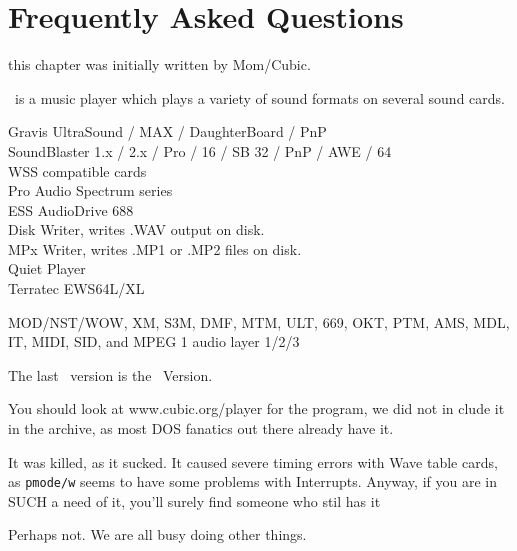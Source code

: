 %
%

\chapter{Frequently Asked Questions}
this chapter was initially written by Mom/Cubic.

{\cp\ is a music player which plays a variety of sound formats on several sound cards.}

{Gravis UltraSound / MAX / DaughterBoard / PnP\\
SoundBlaster 1.x / 2.x / Pro / 16 / SB 32 / PnP / AWE / 64\\
WSS compatible cards\\
Pro Audio Spectrum series\\
ESS AudioDrive 688\\
Disk Writer, writes .WAV output on disk.\\
MPx Writer, writes .MP1 or .MP2 files on disk.\\
Quiet Player\\
Terratec EWS64L/XL}

{MOD/NST/WOW, XM, S3M, DMF, MTM, ULT, 669, OKT, PTM, AMS, MDL, IT, MIDI, SID, and MPEG 1 audio layer 1/2/3}

{The last \cp\ version is the \cpversion\ Version.}

{You should look at www.cubic.org/player for the program, we did not in clude it in the archive, as most DOS fanatics out there already have it.}

{It was killed, as it sucked. It caused severe timing errors with Wave table
cards, as \texttt{pmode/w} seems to have some problems with Interrupts.
Anyway, if you are in SUCH a need of it, you'll surely find someone who stil
has it}

{Perhaps not. We are all busy doing other things.}

